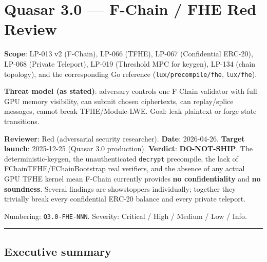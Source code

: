 \documentclass[
]{article}
\author{}
\date{}
\begin{document}
\section{Quasar 3.0 --- F-Chain / FHE Red
Review}\label{quasar-30--f-chain--fhe-red-review}

\textbf{Scope}: LP-013 v2 (F-Chain), LP-066 (TFHE), LP-067 (Confidential
ERC-20), LP-068 (Private Teleport), LP-019 (Threshold MPC for keygen),
LP-134 (chain topology), and the corresponding Go reference
(\texttt{lux/precompile/fhe}, \texttt{lux/fhe}).

\textbf{Threat model (as stated)}: adversary controls one F-Chain
validator with full GPU memory visibility, can submit chosen
ciphertexts, can replay/splice messages, cannot break TFHE/Module-LWE.
Goal: leak plaintext or forge state transitions.

\textbf{Reviewer}: Red (adversarial security researcher). \textbf{Date}:
2026-04-26. \textbf{Target launch}: 2025-12-25 (Quasar 3.0 production).
\textbf{Verdict}: \textbf{DO-NOT-SHIP}. The deterministic-keygen, the
unauthenticated \texttt{decrypt} precompile, the lack of
FChainTFHE/FChainBootstrap real verifiers, and the absence of any actual
GPU TFHE kernel mean F-Chain currently provides \textbf{no
confidentiality} and \textbf{no soundness}. Several findings are
showstoppers individually; together they trivially break every
confidential ERC-20 balance and every private teleport.

Numbering: \texttt{Q3.0-FHE-NNN}. Severity: Critical / High / Medium /
Low / Info.

\begin{center}\rule{0.5\linewidth}{0.5pt}\end{center}

\subsection{Executive summary}\label{executive-summary}
\end{document}
